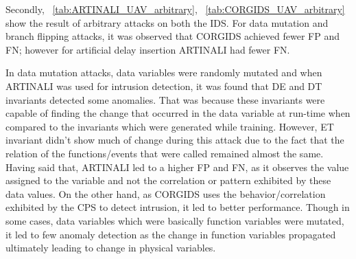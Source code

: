 Secondly, ~\autoref{tab:ARTINALI_UAV_arbitrary}, ~\autoref{tab:CORGIDS_UAV_arbitrary} show the result of arbitrary attacks on both the \ac{IDS}. For data mutation and branch flipping attacks, it was observed that \ac{CORGIDS} achieved fewer \ac{FP} and \ac{FN}; however for artificial delay insertion ARTINALI had fewer \ac{FN}.

\begin{table}
\centering
  \caption{Results of intrusion detection by ARTINALI for arbitrary attacks on \ac{UAV} platform}
  \label{tab:ARTINALI_UAV_arbitrary}
\end{table}

\begin{table}
\centering
  \caption{Results of intrusion detection by \ac{CORGIDS} for arbitrary attacks on \ac{UAV} platform}
  \label{tab:CORGIDS_UAV_arbitrary}
\end{table}


In data mutation attacks, data variables were randomly mutated and when ARTINALI was used for intrusion detection, it was found that D\textbar E and D\textbar T invariants detected some anomalies. That was because these invariants were capable of finding the change that occurred in the data variable at run-time when compared to the invariants which were generated while training. However, E\textbar T invariant didn't show much of change during this attack due to the fact that the relation of the functions/events that were called remained almost the same. Having said that, ARTINALI led to a higher \ac{FP} and \ac{FN}, as it observes the value assigned to the variable and not the correlation or pattern exhibited by these data values. On the other hand, as \ac{CORGIDS} uses the behavior/correlation exhibited by the \ac{CPS} to detect intrusion, it led to better performance. Though in some cases, data variables which were basically function variables were mutated, it led to few anomaly detection as the change in function variables propagated ultimately leading to change in physical variables.

